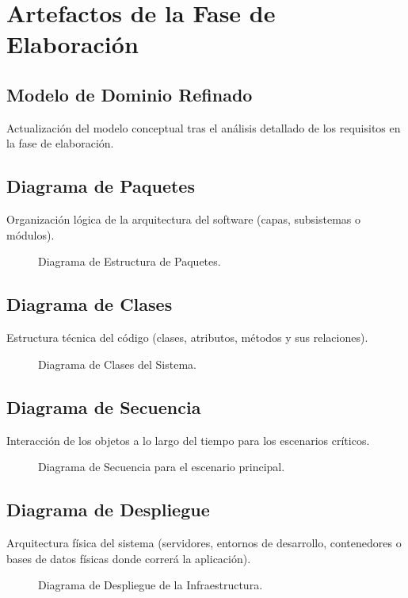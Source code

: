 \documentclass[12pt,letterpaper]{article}
\begin{document}
\newpage
\section{Artefactos de la Fase de Elaboración}

\subsection{Modelo de Dominio Refinado}
Actualización del modelo conceptual tras el análisis detallado de los requisitos en la fase de elaboración.

\subsection{Diagrama de Paquetes}
Organización lógica de la arquitectura del software (capas, subsistemas o módulos).
\begin{figure}[H]
    \centering
    \caption{Diagrama de Estructura de Paquetes.}
\end{figure}

\subsection{Diagrama de Clases}
Estructura técnica del código (clases, atributos, métodos y sus relaciones).
\begin{figure}[H]
    \centering
    \caption{Diagrama de Clases del Sistema.}
\end{figure}

\subsection{Diagrama de Secuencia}
Interacción de los objetos a lo largo del tiempo para los escenarios críticos.
\begin{figure}[H]
    \centering
    \caption{Diagrama de Secuencia para el escenario principal.}
\end{figure}

\subsection{Diagrama de Despliegue}
Arquitectura física del sistema (servidores, entornos de desarrollo, contenedores o bases de datos físicas donde correrá la aplicación).
\begin{figure}[H]
    \centering
    \caption{Diagrama de Despliegue de la Infraestructura.}
\end{figure}
\end{document}
